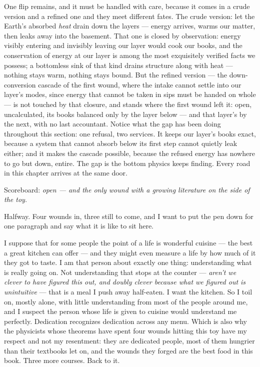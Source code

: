 \documentclass[fontsize=11pt,paper=a4,pagesize=auto,parskip=half-]{scrbook}
\begin{document}
One flip remains, and it must be handled with care, because it comes in a crude version and a refined one and they meet different fates. The crude version: let the Earth's absorbed \emph{heat} drain down the layers --- energy arrives, warms our matter, then leaks away into the basement. That one is closed by observation: energy visibly entering and invisibly leaving our layer would cook our books, and the conservation of energy at our layer is among the most exquisitely verified facts we possess; a bottomless sink of that kind drains structure along with heat --- nothing stays warm, nothing stays bound. But the refined version --- the down-conversion cascade of the first wound, where the intake cannot settle into our layer's modes, since energy that cannot be taken in sips must be handed on whole --- is not touched by that closure, and stands where the first wound left it: open, uncalculated, its books balanced only by the layer below --- and that layer's by the next, with no last accountant. Notice what the gap has been doing throughout this section: one refusal, two services. It keeps our layer's books exact, because a system that cannot absorb below its first step cannot quietly leak either; and it makes the cascade possible, because the refused energy has nowhere to go but down, entire. The gap is the bottom physics keeps finding. Every road in this chapter arrives at the same door.

Scoreboard: \emph{open --- and the only wound with a growing literature on the side of the toy.}

Halfway. Four wounds in, three still to come, and I want to put the pen down for one paragraph and say what it is like to sit here.

I suppose that for some people the point of a life is wonderful cuisine --- the best a great kitchen can offer --- and they might even measure a life by how much of it they got to taste. I am that person about exactly one thing: understanding what is really going on. Not understanding that stops at the counter --- \emph{aren't we clever to have figured this out, and doubly clever because what we figured out is unintuitive} --- that is a meal I push away half-eaten. I want the kitchen. So I toil on, mostly alone, with little understanding from most of the people around me, and I suspect the person whose life is given to cuisine would understand me perfectly. Dedication recognizes dedication across any menu. Which is also why the physicists whose theorems have spent four wounds hitting this toy have my respect and not my resentment: they are dedicated people, most of them hungrier than their textbooks let on, and the wounds they forged are the best food in this book. Three more courses. Back to it.
\end{document}

